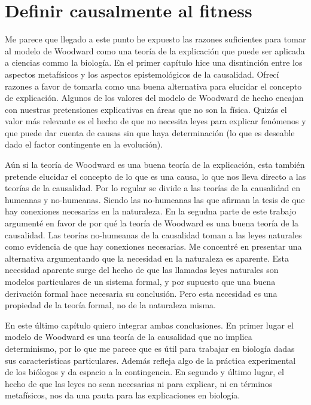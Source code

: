 \chapter{Definir causalmente al fitness}

Me parece que llegado a este punto he expuesto las razones suficientes para tomar al modelo de  Woodward como una teoría de la explicación que puede ser aplicada a ciencias commo la biología. En el primer capítulo hice una disntinción entre los aspectos metafísicos y los aspectos epistemológicos de la causalidad.  Ofrecí razones a  favor de tomarla como una buena alternativa para elucidar el concepto de explicación. Algunos de los valores del modelo de Woodward de hecho encajan con nuestras pretensiones explicativas en áreas que no son la física. Quizás el valor más relevante es el hecho de que no necesita leyes para explicar fenómenos y que puede dar cuenta de causas sin que haya determinación (lo que es deseable dado el factor contingente en la evolución).

Aún si la teoría de Woodward es una buena teoría de la explicación, esta también pretende elucidar el concepto de lo que es una causa, lo que nos lleva directo a las teorías de la causalidad. Por lo regular se divide a las teorías de la causalidad en humeanas y no-humeanas. Siendo las no-humeanas las que afirman la tesis de que hay conexiones necesarias en la naturaleza. En la segudna parte de este trabajo argumenté en favor de por qué la teoría de Woodward es una buena teoría de la causalidad. Las teorías no-humeanas de la causalidad toman a las leyes naturales como evidencia de que hay conexiones necesarias. Me concentré en presentar una alternativa argumentando que la necesidad en la naturaleza es aparente. Esta necesidad aparente surge del hecho de que las llamadas leyes naturales son modelos particulares de un sistema formal, y por supuesto que una buena derivación formal hace necesaria su conclusión. Pero esta necesidad es una propiedad de la teoría formal, no de la naturaleza misma.

En este último capítulo quiero integrar ambas conclusiones. En primer lugar el modelo de Woodward es una teoría de la causalidad que no implica determinismo, por lo que me parece que es útil para trabajar en biología dadas sus características particulares. Además refleja algo de la práctica experimental de los biólogos y da espacio a la contingencia. En segundo y último lugar,  el hecho de que las leyes no sean necesarias ni para explicar, ni en términos metafísicos, nos da una pauta para las explicaciones en biología.

